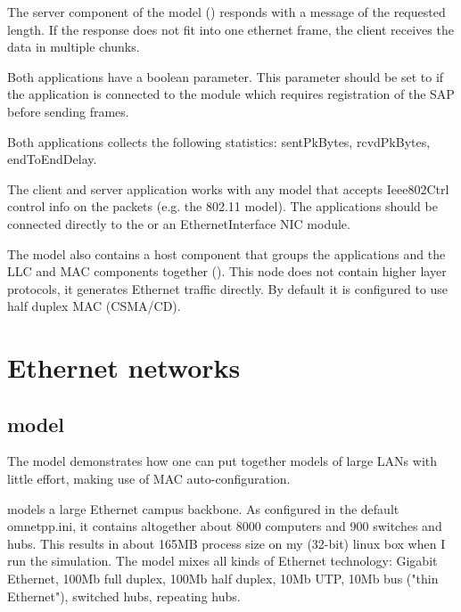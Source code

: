 The server component of the model () responds with a
 message of the requested length. If the response does
not fit into one ethernet frame, the client receives the data in multiple
chunks.


Both applications have a  boolean parameter.
This parameter should be set to  if the application is connected
to the  module which requires registration of the SAP
before sending frames.

Both applications collects the following statistics: sentPkBytes, rcvdPkBytes,
endToEndDelay.

The client and server application works with any model that accepts
Ieee802Ctrl control info on the packets (e.g. the 802.11 model).
The applications should be connected directly to the 
or an EthernetInterface NIC module.

The model also contains a host component that groups the applications
and the LLC and MAC components together (). This node does
not contain higher layer protocols, it generates Ethernet traffic directly.
By default it is configured to use half duplex MAC (CSMA/CD).

\section{Ethernet networks}

\subsection{ model}

The  model demonstrates how one can put together models of large
LANs with little effort, making use of MAC auto-configuration.

 models a large Ethernet campus backbone. As configured in the
default omnetpp.ini, it contains altogether about 8000 computers
and 900 switches and hubs. This results in about 165MB process size
on my (32-bit) linux box when I run the simulation.
The model mixes all kinds of Ethernet technology: Gigabit Ethernet,
100Mb full duplex, 100Mb half duplex, 10Mb UTP, 10Mb bus ("thin Ethernet"),
switched hubs, repeating hubs.

